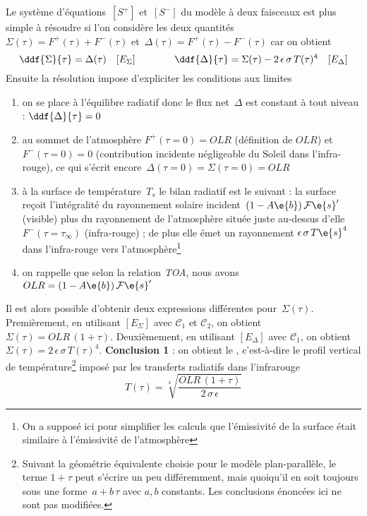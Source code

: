 \sk
Le système d'équations~$[S^+]$ et~$[S^-]$ du modèle à deux faisceaux
est plus simple à résoudre si l'on considère les deux quantités~$\Sigma(\tau)=F^{+}(\tau)+F^{-}(\tau)$ et~$\Delta(\tau)=F^{+}(\tau)-F^{-}(\tau)$ car on obtient
\[
\ddf{\Sigma}{\tau} = \Delta(\tau) \quad [E_\Sigma] 
\qquad\qquad 
\ddf{\Delta}{\tau} = \Sigma(\tau) - 2\,\epsilon\,\sigma\,T(\tau)^4 \quad [E_\Delta]
\]
\noindent Ensuite la résolution impose d'expliciter les conditions aux limites
\begin{enumerate}[$\mathcal{C}_1$]
\item on se place à l'équilibre radiatif donc le flux net~$\Delta$ est constant à tout niveau : $\ddf{\Delta}{\tau}=0$
\item au sommet de l'atmosphère $F^+(\tau=0) = OLR$ (définition de $OLR$) et $F^-(\tau=0) = 0$ (contribution
incidente négligeable du Soleil dans l'infra-rouge), ce qui s'écrit encore~$\Delta(\tau=0)=\Sigma(\tau=0)=OLR$
\item à la surface de température~$T_s$ le bilan radiatif est le suivant : la surface reçoit l'intégralité du rayonnement
solaire incident~$(1-A\e{b}) \, \mathcal{F}\e{s}'$ (visible) plus du rayonnement de l'atmosphère située
juste au-dessus d'elle~$F^-(\tau=\tau_{\infty})$ (infra-rouge) ; de plus elle émet un rayonnement
$\epsilon\,\sigma\,T\e{s}^4$ dans l'infra-rouge vers l'atmosphère\footnote{On a supposé ici pour simplifier les calculs que l'émissivité
de la surface était similaire à l'émissivité de l'atmosphère}
\item on rappelle que selon la relation \emph{TOA}, nous avons $OLR = (1-A\e{b}) \, \mathcal{F}\e{s}'$
\end{enumerate}


\sk
Il est alors possible d'obtenir deux expressions différentes pour~$\Sigma(\tau)$.
Premièrement, en utilisant $[E_\Sigma]$ avec $\mathcal{C}_1$ et $\mathcal{C}_2$, on obtient~$\Sigma(\tau)=OLR \, (1+\tau)$.
Deuxièmement, en utilisant $[E_\Delta]$ avec $\mathcal{C}_1$, on obtient~$\Sigma(\tau)=2\,\epsilon\,\sigma\,T(\tau)^4$.
\textbf{Conclusion 1} : on obtient le , 
c'est-à-dire le profil vertical de température\footnote{Suivant la géométrie
équivalente choisie pour le modèle plan-parallèle, le terme $1+\tau$
peut s'écrire un peu différemment, mais quoiqu'il en soit toujours sous une
forme~$a+b\,\tau$ avec $a,b$ constants. Les conclusions énoncées ici ne sont pas
modifiées.} imposé par les transferts radiatifs dans l'infrarouge
\[
T(\tau) = \sqrt[4]{\frac{OLR\,(1+\tau)}{2\,\sigma\,\epsilon}}
\]

